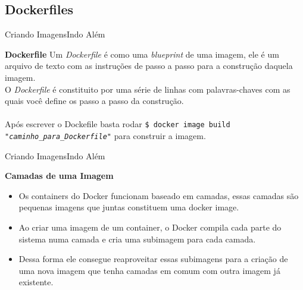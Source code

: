 \documentclass[10pt]{beamer}
\begin{document}
\subsection{Dockerfiles}
\begin{frame}{Criando Imagens}{Indo Além}
    \begin{block}{\textbf{Dockerfile}}
        Um \textit{Dockerfile} é como uma \textit{blueprint} de uma imagem, ele é um arquivo de texto com as instruções de passo a passo para a construção daquela imagem.\\
        O \textit{Dockerfile} é constituito por uma série de linhas com palavras-chaves com as quais você define os passo a passo da construção.\\[.5cm]
        \pause
        \centering
        \\[.5cm]
        \pause
        Após escrever o Dockefile basta rodar \texttt{\$ docker image build \textit{"caminho\_para\_Dockerfile"}} para construir a imagem.
    \end{block}
\end{frame}
\begin{frame}{Criando Imagens}{Indo Além}
    \begin{block}{\textbf{Camadas de uma Imagem}}
        \begin{itemize}
            \item<1-> Os containers do Docker funcionam baseado em camadas, essas camadas são pequenas imagens que juntas constituem uma docker image.
            \item<1-> Ao criar uma imagem de um container, o Docker compila cada parte do sistema numa camada e cria uma subimagem para cada camada.
            \item<1-> Dessa forma ele consegue reaproveitar essas subimagens para a criação de uma nova imagem que tenha camadas em comum com outra imagem já existente.
        \end{itemize}
    \end{block}
\end{frame}
\end{document}
